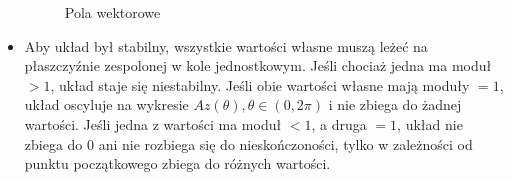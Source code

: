 \documentclass[a4paper, 12pt]{article}
\begin{document}
\begin{itemize}
\begin{figure}[h]
\begin{center}
				\caption{Pola wektorowe}
			\end{center}
		\end{figure}
		\item Aby układ był stabilny, wszystkie wartości własne muszą leżeć na płaszczyźnie zespolonej w kole jednostkowym. Jeśli chociaż jedna ma moduł $>1$, układ staje się niestabilny. Jeśli obie wartości własne mają moduły $=1$, układ oscyluje na wykresie $Az(\theta), \theta \in (0,2\pi)$ i nie zbiega do żadnej wartości. Jeśli jedna z wartości ma moduł $<1$, a druga $=1$, układ nie zbiega do 0 ani nie rozbiega się do nieskończoności, tylko w zależności od punktu początkowego zbiega do różnych wartości.
		\begin{figure}[h]
			\begin{center}

\end{center}
\end{figure}
\end{itemize}
\end{document}
